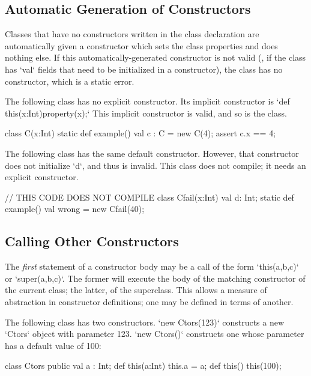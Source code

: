 \subsection{Automatic Generation of Constructors}

Classes that have no constructors written in the class declaration are
automatically given a constructor which sets the class properties and does
nothing else. If this automatically-generated constructor is not valid (\eg,
if the class has \xcd`val` fields that need to be initialized in a
constructor), the class has no constructor, which is a static error.

\begin{ex}
The following class has no explicit constructor.
Its implicit constructor is 
\xcd`def this(x:Int){property(x);}`
This implicit constructor is valid, and so is the class. 
\begin{xten}
class C(x:Int) {
  static def example() {
    val c : C = new C(4);
    assert c.x == 4;
  }
}
\end{xten}
\noindent 


The following class has the same default constructor.  However, that
constructor does not initialize \xcd`d`, and thus is invalid.  This 
class does not compile; it needs an explicit constructor.
\begin{xten}
// THIS CODE DOES NOT COMPILE
class Cfail(x:Int) {
  val d: Int;
  static def example() {
    val wrong = new Cfail(40);
  }
}
\end{xten}
%


\end{ex}

\subsection{Calling Other Constructors}
\label{sect:call-another-ctor}

The {\em first} statement of a constructor body may be a call of the form 
\xcd`this(a,b,c)` or \xcd`super(a,b,c)`.  The former will execute the body of
the matching constructor of the current class; the latter, of the superclass. 
This allows a measure of abstraction in constructor definitions; one may be
defined in terms of another.

\begin{ex}
The following class has two constructors.  \xcd`new Ctors(123)` constructs a
new \xcd`Ctors` object with parameter 123.  \xcd`new Ctors()` constructs one
whose parameter has a default value of 100: 
\begin{xten}
class Ctors {
  public val a : Int;
  def this(a:Int) { this.a = a; }
  def this()      { this(100);  }
}
\end{xten}
\end{ex}

